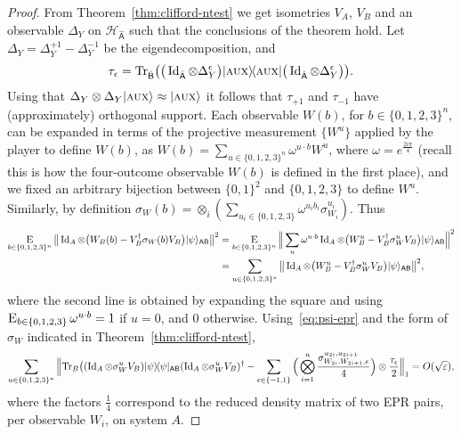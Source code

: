 \documentclass[11pt]{article}
\theoremstyle{remark}
\theoremstyle{definition}
\newcommand{\ket}[1]{|#1\rangle}
\newcommand{\bra}[1]{\langle#1|}
\newcommand{\proj}[1]{\ket{#1}\!\bra{#1}}
\newcommand{\Tr}{\mbox{\rm Tr}}
\newcommand{\Id}{\ensuremath{\mathop{\rm Id}\nolimits}}
\newcommand{\Es}[1]{\ensuremath{\mathop{\textsc{E}}_{#1}}}
\newcommand{\reg}[1]{{\textsf{#1}}}
\newcommand{\mH}{\mathcal{H}}
\newcommand{\eps}{\varepsilon}
\newcommand{\aux}{\textsc {aux}}
\begin{document}
\begin{proof}
From Theorem~\ref{thm:clifford-ntest} we get isometries $V_A$, $V_B$ and an observable $\Delta_Y$ on ${\mH}_{\hat{\reg{A}}}$ such that the conclusions of the theorem hold. Let $\Delta_Y = \Delta_Y^{+1}-\Delta_Y^{-1}$ be the eigendecomposition, and 
$$\tau_{\epsilon} = \Tr_{\hat{\reg{B}}}\big( \big(\Id_{\hat{\reg{A}}}\otimes \Delta_Y^\epsilon \big)\proj{\aux}\big(\Id_{\hat{\reg{A}}}\otimes \Delta_Y^\epsilon\big)\big).$$
Using that $\Delta_Y \otimes \Delta_Y \ket{\aux} \approx \ket{\aux}$ it follows that $\tau_{+1}$ and $\tau_{-1}$ have (approximately) orthogonal support. 
Each observable $W(b)$, for $b\in\{0,1,2,3\}^n$, can be expanded in terms of the projective measurement $\{W^u\}$ applied by the player to define $W(b)$, as $W(b) = \sum_{u\in \{0,1,2,3\}^{n}}  \omega^{u\cdot b} W^u$, where $\omega = e^{\frac{2i\pi}{4}}$ (recall this is how the four-outcome observable $W(b)$ is defined in the first place), and we fixed an arbitrary bijection between $\{0,1\}^2$ and $\{0,1,2,3\}$ to define $W^u$. Similarly, by definition $\sigma_W(b) = \otimes_i (\sum_{u_i\in \{0,1,2,3\}} \omega^{u_ib_i} \sigma_{W_i}^{u_i})$. Thus
\begin{align*}
\Es{b\in\{0,1,2,3\}^n} \big\| \Id_A \otimes \big(  W_B(b) - V_B^\dagger \sigma_{W}(b) V_B\big)   \ket{\psi}_{\reg{AB}} \big\|^2
&= \Es{b\in\{0,1,2,3\}^n}\Big\| \sum_u \omega^{u\cdot b} \Id_A \otimes \big(  W_B^u - V_B^\dagger\sigma_{W}^u V_B\big)   \ket{\psi}_{\reg{AB}} \Big\|^2    \\
&= \sum_{u\in\{0,1,2,3\}^n}\big\|  \Id_A \otimes \big(  W_B^u - V_B^\dagger\sigma_{W}^u V_B\big)   \ket{\psi}_{\reg{AB}} \big\|^2,       
\end{align*}
where the second line is obtained by expanding the square and using $\Es{b \in \{0,1,2,3\}} \omega^{u \cdot b} = 1$ if $u=0$, and $0$ otherwise. 
Using~\eqref{eq:psi-epr} and the form of $\sigma_W$ indicated in Theorem~\ref{thm:clifford-ntest},
\begin{align*}
    \sum_{u\in\{0,1,2,3\}^n}\Big\|  \Tr_B \big( (\Id_A \otimes \sigma_{W}^u V_B)   \proj{\psi}_{\reg{AB}} (\Id_A \otimes \sigma_{W}^u V_B)^\dagger - \sum_{\epsilon\in\{-1,1\}} \Big( \bigotimes_{i=1}^n \frac{\sigma_{W_{2i},W_{2i+1},\epsilon}^{u_{2i},u_{2i+1}}}{4}\Big)\otimes \frac{\tau_\epsilon}{2}   \Big\|_1 = O(\sqrt{\eps}),
\end{align*}
where the factors $\frac{1}{4}$ correspond to the reduced density matrix of two EPR pairs, per observable $W_i$, on system $A$. 
\end{proof}
\end{document}
